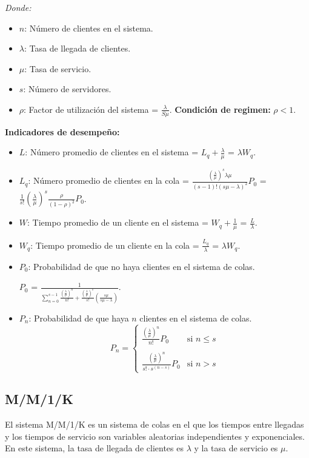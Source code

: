 \documentclass{templateNote}
\begin{document}
\textit{Donde:}
\begin{itemize}
    \item $n$: Número de clientes en el sistema.
    \item $\lambda$: Tasa de llegada de clientes.
    \item $\mu$: Tasa de servicio.
    \item $s$: Número de servidores.
    \item $\rho$: Factor de utilización del sistema = $\frac{\lambda}{S\mu}$. \textbf{Condición de regimen:} $\rho < 1$.
\end{itemize}

\textbf{Indicadores de desempeño:}
\begin{itemize}
    \item $L$: Número promedio de clientes en el sistema = $L_q + \frac{\lambda}{\mu}$ = $\lambda W_q$.
    \item $L_q$: Número promedio de clientes en la cola = $\frac{(\frac{\lambda}{\mu})^s \lambda \mu}{(s-1)! (s\mu-\lambda)^2}P_0$ = $\frac{1}{s!}(\frac{\lambda}{\mu})^s \frac{\rho}{(1-\rho)^2}P_0$.
    \item $W$: Tiempo promedio de un cliente en el sistema = $W_q+\frac{1}{\mu}$ = $\frac{L}{\lambda}$.
    \item $W_q$: Tiempo promedio de un cliente en la cola = $\frac{L_q}{\lambda}$ = $\lambda W_q$.
    \item $P_0$: Probabilidad de que no haya clientes en el sistema de colas.
    \begin{center}
        $P_0$ = $\frac{1}{\sum_{n=0}^{s-1} \frac{(\frac{\lambda}{\mu})^n}{n!} + \frac{(\frac{\lambda}{\mu})^s}{s!} (\frac{s\mu}{s\mu-\lambda})}$.
    \end{center}
    \item $P_n$: Probabilidad de que haya $n$ clientes en el sistema de colas.
    \[
    P_n = \left\{
        \begin{array}{ll}
          \frac{(\frac{\lambda}{\mu})^n}{n!}P_0 & \text{si } n \leq  s \\\\
          \frac{(\frac{\lambda}{\mu})^n}{s!\cdot s^{(n-s)}}P_0 & \text{si } n > s
        \end{array}
      \right.
    \]  
    
\end{itemize}

\subsection{M/M/1/K}
\noindent El sistema M/M/1/K es un sistema de colas en el que los tiempos entre llegadas y los tiempos de servicio son variables aleatorias independientes y exponenciales. En este sistema, la tasa de llegada de clientes es $\lambda$ y la tasa de servicio es $\mu$.
\end{document}
